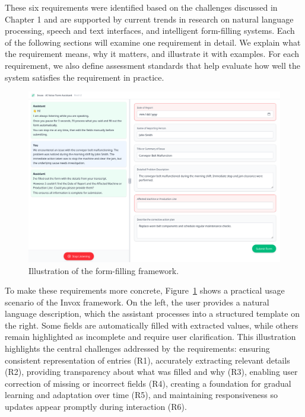 These six requirements were identified based on the challenges discussed in Chapter 1 and are supported by current trends in research on natural language processing, speech and text interfaces, and intelligent form-filling systems. Each of the following sections will examine one requirement in detail. We explain what the requirement means, why it matters, and illustrate it with examples. For each requirement, we also define assessment standards that help evaluate how well the system satisfies the requirement in practice.  

\begin{figure}[h!]
    \centering
    \includegraphics[width=\textwidth]{images/form-filling-example.png}
    \caption{Illustration of the form-filling framework. }
    \label{fig:form-filling-example}
\end{figure}


To make these requirements more concrete, Figure~\ref{fig:form-filling-example} shows a practical usage scenario of the Invox framework. On the left, the user provides a natural language description, which the assistant processes into a structured template on the right. Some fields are automatically filled with extracted values, while others remain highlighted as incomplete and require user clarification. This illustration highlights the central challenges addressed by the requirements: ensuring consistent representation of entries (R1), accurately extracting relevant details (R2), providing transparency about what was filled and why (R3), enabling user correction of missing or incorrect fields (R4), creating a foundation for gradual learning and adaptation over time (R5), and maintaining responsiveness so updates appear promptly during interaction (R6).

